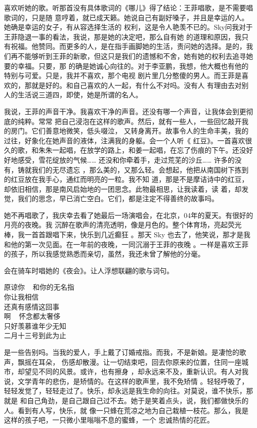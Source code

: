 \documentclass[12pt,a4paper]{article}
\begin{document}
		喜欢听她的歌。听那首没有具体歌词的《哪儿》得了结论：王菲唱歌，是不需要唱歌词的，只是随
	意哼着，就已成天籁。她说自己有副好嗓子，并且是幸运的人。她确是幸运的女子，有从容选择生活的
	权利，这是令人艳羡不已的。Sky问我对于王菲隐退一事的看法，我说，那是她的决定吧，那么自有她
	的道理和原因，我只有祝福。他赞同。而更多的人，是在指手画脚她的生活，责问她的选择。是的，我
	们再不能够听到王菲的新歌，但这只是我们的遗憾和不舍，她有她的权利去追寻她要的幸福。只要，那
	的确是她诚心向往的。对于李亚鹏，我想，他大概也有他的特别与可爱。只是，我并不喜欢，那个电视
	剧片里几分憨傻的男人。而王菲是喜欢的，那就是好的。和自己喜欢的人一起，有什么不对吗。没有人
	有理由去对别人的生活说三道四，即使，她是所谓的名人。

		我说，王菲的声音干净。我喜欢干净的声音。还没有哪一个声音，让我体会到更彻底的纯粹。常常
	把自己浸泡在这样的歌声。然后，就有一些人，一些回忆敲开我的房门。它们善意地微笑，低头啜泣，
	又转身离开。故事令人的生命丰美，我的过往，好象化在她声音的液体，注满我的身躯。会一个人听《
	红豆》。一首喜欢很久的歌，和朱朱一起唱，在放学的路上，和姜一起唱，在忘了伤痕的下午。还没好
	好地感受，雪花绽放的气候…… 还没和你牵着手，走过荒芜的沙丘…… 许多的没有，铸就我们的无尽遗忘
	，那么美的，又那么轻。会想起，他把从南国树下拣到的红豆放在我手心，通红而明亮的一粒。我不知
	道，那是不是摩诘诗中的红豆，却依旧相信，那是南风启始地的一团思念。此物最相思，让我读着，读
	着，却发觉，我们的思念，早已消亡空白。它们，都是注定不得善终的故事吗。

		她不再唱歌了，我庆幸去看了她最后一场演唱会，在北京，04年的夏天。有很好的月亮的夜晚。我
	沉醉在歌声的清亮透明，像是月色的。整个体育场，亮起荧光棒，我一首首跟唱下来，快乐到几近癫狂
	。那天 Sky 也去了，他笑说，那才是我和他的第一次见面。在一年前的夜晚，一同沉溺于王菲的夜晚
	。一样是喜欢王菲的孩子，所以我感觉熟悉而亲切，虽然，我还未曾了解他的分毫。

		会在骑车时唱她的《夜会》。让人浮想联翩的歌与词句。

		\longpoem{}{}{}
		原谅你 ~ 和你的无名指 \\
		你让我相信 \\
		还真有感情这回事 \\
		啊 ~ 怀念都太奢侈 \\
		只好羡慕谁年少无知 \\
		二月十三号到此为止
		\endlongpoem


		是一些告别吗。当我的爱人，手上戴了订婚戒指。而我，不是新娘。是凄怆的歌声，飘摇在耳朵，
	伤感却散漫。让一切结束吧，回去你原来的位置，住同一座城市，却望见不同的风景。或许，也有擦身
	，却永远来不及，重新认识。有人对我说，文学青年的悲伤，是矫情的。在这样的歌声里，我不免矫情
	。轻轻呼吸了，轻轻发觉了，轻轻走过了。快乐，却永远是我生命的向往。对莫说，谁不快乐，那就是
	和自己角劲，是自己跟自己过不去。她于是笑着点头，说，我们都做快乐的人。看到有人写，快乐，就
	像一只蜂在荒凉之地为自己栽植一枝花。那么，我是这样的孩子吧，一只微小里嗡嗡不息的蜜蜂，一个
	忠诚热情的花匠。
\end{document}
